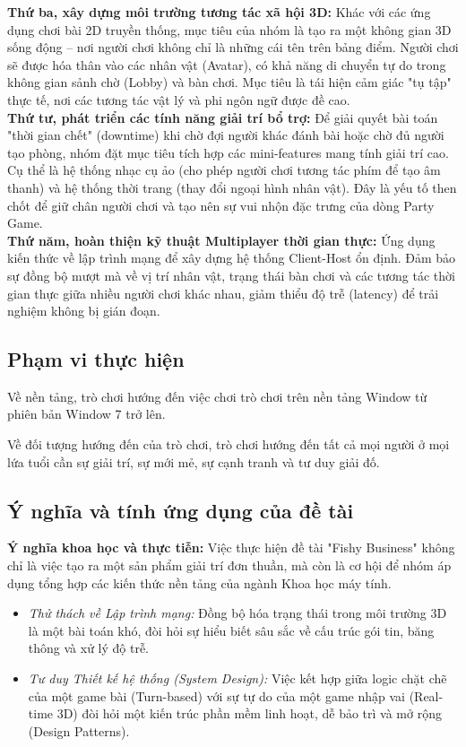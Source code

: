     \textbf{Thứ ba, xây dựng môi trường tương tác xã hội 3D:}
    Khác với các ứng dụng chơi bài 2D truyền thống, mục tiêu của nhóm là tạo ra một không gian 3D sống động – nơi người chơi không chỉ là những cái tên trên bảng điểm. Người chơi sẽ được hóa thân vào các nhân vật (Avatar), có khả năng di chuyển tự do trong không gian sảnh chờ (Lobby) và bàn chơi. Mục tiêu là tái hiện cảm giác "tụ tập" thực tế, nơi các tương tác vật lý và phi ngôn ngữ được đề cao.\\
    
    \textbf{Thứ tư, phát triển các tính năng giải trí bổ trợ:}
    Để giải quyết bài toán "thời gian chết" (downtime) khi chờ đợi người khác đánh bài hoặc chờ đủ người tạo phòng, nhóm đặt mục tiêu tích hợp các mini-features mang tính giải trí cao. Cụ thể là hệ thống nhạc cụ ảo (cho phép người chơi tương tác phím để tạo âm thanh) và hệ thống thời trang (thay đổi ngoại hình nhân vật). Đây là yếu tố then chốt để giữ chân người chơi và tạo nên sự vui nhộn đặc trưng của dòng Party Game.\\
    
    \textbf{Thứ năm, hoàn thiện kỹ thuật Multiplayer thời gian thực:}
    Ứng dụng kiến thức về lập trình mạng để xây dựng hệ thống Client-Host ổn định. Đảm bảo sự đồng bộ mượt mà về vị trí nhân vật, trạng thái bàn chơi và các tương tác thời gian thực giữa nhiều người chơi khác nhau, giảm thiểu độ trễ (latency) để trải nghiệm không bị gián đoạn.
    
\subsection{Phạm vi thực hiện}

    Về nền tảng, trò chơi hướng đến việc chơi trò chơi trên nền tảng Window từ phiên bản Window 7 trở lên.
    
    Về đối tượng hướng đến của trò chơi, trò chơi hướng đến tất cả mọi người ở mọi lứa tuổi cần sự giải trí, sự mới mẻ, sự cạnh tranh và tư duy giải đố.


\subsection{Ý nghĩa và tính ứng dụng của đề tài}

    \textbf{Ý nghĩa khoa học và thực tiễn:}
    Việc thực hiện đề tài "Fishy Business" không chỉ là việc tạo ra một sản phẩm giải trí đơn thuần, mà còn là cơ hội để nhóm áp dụng tổng hợp các kiến thức nền tảng của ngành Khoa học máy tính.
    \begin{itemize}
        \item \textit{Thử thách về Lập trình mạng:} Đồng bộ hóa trạng thái trong môi trường 3D là một bài toán khó, đòi hỏi sự hiểu biết sâu sắc về cấu trúc gói tin, băng thông và xử lý độ trễ.
        \item \textit{Tư duy Thiết kế hệ thống (System Design):} Việc kết hợp giữa logic chặt chẽ của một game bài (Turn-based) với sự tự do của một game nhập vai (Real-time 3D) đòi hỏi một kiến trúc phần mềm linh hoạt, dễ bảo trì và mở rộng (Design Patterns).
    \end{itemize}
    
